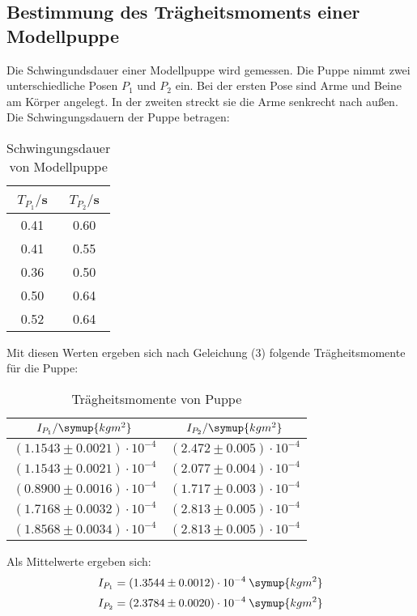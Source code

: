 \subsection{Bestimmung des Trägheitsmoments einer Modellpuppe}
Die Schwingundsdauer einer Modellpuppe wird gemessen. Die Puppe nimmt zwei unterschiedliche
Posen $P_1$ und $P_2$ ein. Bei der ersten Pose sind Arme und Beine am Körper angelegt. In der zweiten
streckt sie die Arme senkrecht nach außen. Die Schwingungsdauern der Puppe betragen:
\begin{table}
  \centering
  \caption{Schwingungsdauer von Modellpuppe}
  \label{tab:Schwingungsdauer von Modellpuppe}
  \begin{tabular}{c c}
    \toprule
    $T_{P_1}/$s & $T_{P_2}/$s \\
    \midrule
    0.41 & 0.60 \\
    0.41 & 0.55 \\
    0.36 & 0.50 \\
    0.50 & 0.64 \\
    0.52 & 0.64 \\
    \bottomrule
  \end{tabular}
\end{table}

Mit diesen Werten ergeben sich nach Geleichung (3) folgende Trägheitsmomente
für die Puppe:
\begin{table}[H]
  \centering
  \caption{Trägheitsmomente von Puppe}
  \label{tab:Trägheitsmomente von Puppe}
  \begin{tabular}{c c}
    \toprule
    $I_{P_1}/\symup{kgm^2}$ & $I_{P_2}/\symup{kgm^2}$ \\
    \midrule
    $(1.1543 \pm 0.0021)\cdot 10^{-4}$ & $(2.472 \pm 0.005)\cdot 10^{-4}$ \\
    $(1.1543 \pm 0.0021)\cdot 10^{-4}$ & $(2.077 \pm 0.004)\cdot 10^{-4}$ \\
    $(0.8900 \pm 0.0016)\cdot 10^{-4}$ & $(1.717 \pm 0.003)\cdot 10^{-4}$ \\
    $(1.7168 \pm 0.0032)\cdot 10^{-4}$ & $(2.813 \pm 0.005)\cdot 10^{-4}$ \\
    $(1.8568 \pm 0.0034)\cdot 10^{-4}$ & $(2.813 \pm 0.005)\cdot 10^{-4}$ \\
    \bottomrule
  \end{tabular}
\end{table}

Als Mittelwerte ergeben sich:
\begin{equation}
  I_{P_1} = (1.3544 \pm 0.0012)\cdot 10^{-4}\: \symup{kgm^2}
\end{equation}
\begin{equation}
  I_{P_2} = (2.3784 \pm 0.0020)\cdot 10^{-4}\: \symup{kgm^2}
\end{equation}
